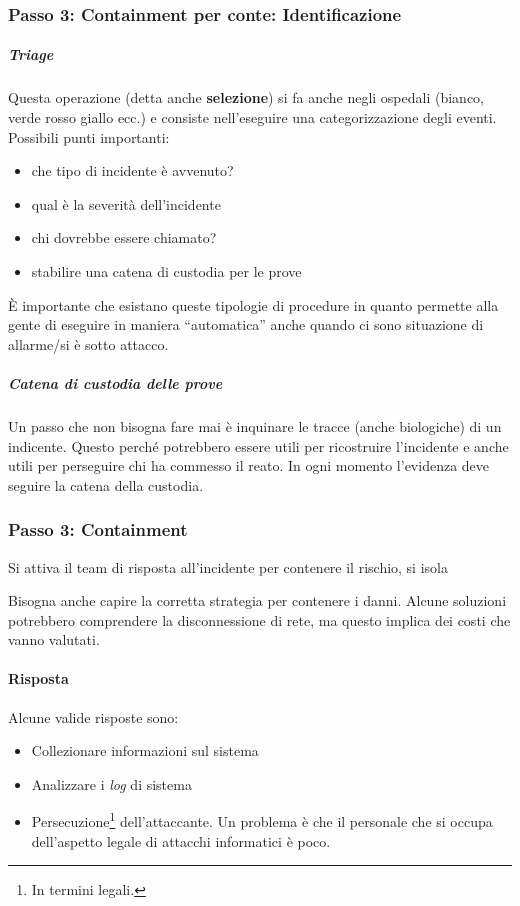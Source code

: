 \subsubsection{Passo 3: Containment per conte: Identificazione}
\subparagraph*{Triage} Questa operazione (detta anche \textbf{selezione}) si fa 
anche negli ospedali (bianco, verde rosso giallo ecc.) e consiste nell'eseguire 
una categorizzazione degli eventi. Possibili punti importanti:
\begin{itemize}
\item che tipo di incidente è avvenuto?
\item qual è la severità dell'incidente
\item chi dovrebbe essere chiamato?
\item stabilire una catena di custodia per le prove
\end{itemize}
È importante che esistano queste tipologie di procedure in quanto permette alla 
gente di eseguire in maniera ``automatica'' anche quando ci sono situazione di 
allarme/si è sotto attacco.

\subparagraph*{Catena di custodia delle prove} Un passo che non bisogna fare mai 
è inquinare le tracce (anche biologiche) di un indicente. Questo perché 
potrebbero essere utili per ricostruire l'incidente e anche utili per perseguire 
chi ha commesso il reato.
In ogni momento l'evidenza deve seguire la catena della custodia. %


\subsubsection{Passo 3: Containment}

Si attiva il team di risposta all'incidente per contenere il rischio, si 
isola


Bisogna anche capire la corretta strategia per contenere i danni. Alcune 
soluzioni potrebbero comprendere la disconnessione di rete, ma questo implica 
dei costi che vanno valutati.



\paragraph*{Risposta}

Alcune valide risposte sono:
\begin{itemize}
\item Collezionare informazioni sul sistema
\item Analizzare i \textit{log} di sistema
\item Persecuzione\footnote{In termini legali.} dell'attaccante. Un problema è 
che il personale che si occupa dell'aspetto legale di attacchi informatici è 
poco.  %
\end{itemize}






